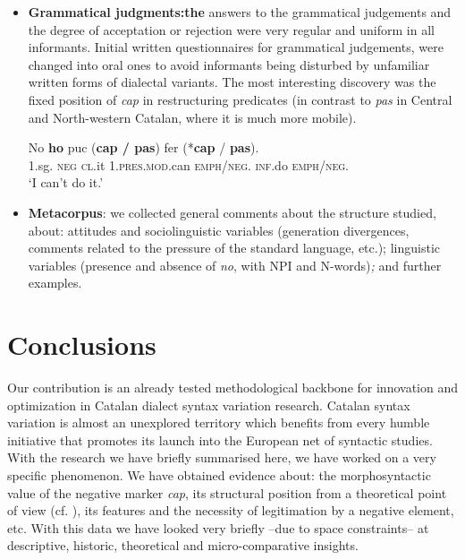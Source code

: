 \documentclass[output=paper]{LSP/langsci}
\begin{document}
\begin{itemize}
\item \textbf{Grammatical judgments:}\textbf{\textmd{the}} answers to the grammatical judgements and the degree of acceptation or rejection were very regular and uniform in all informants. Initial written questionnaires for grammatical judgements, were changed into oral ones to avoid informants being disturbed by unfamiliar written forms of dialectal variants. The most interesting discovery was the fixed position of \textit{cap }in restructuring predicates (in contrast to \textit{pas }in Central and North-western Catalan, where it is much more mobile).

\ea
\label{ex:}
 {No} \textbf{ho} {puc}   {(\texttt{\textsuperscript{\checkmark}}\textbf{cap / pas})}   {fer} {(*\textbf{cap} / \texttt{\textsuperscript{\checkmark}}\textbf{pas}).}\\
{1.sg.}  {\textsc{neg}}   {\textsc{cl}.it}  {1.\textsc{pres.mod}.can}  {\textsc{emph}/\textsc{neg}.}  {\textsc{inf}.do} {\textsc{emph}/\textsc{neg}.}\\
\glt `I can’t do it.'\\
\z

\item \textbf{Metacorpus}: we collected general comments about the structure studied, about: attitudes and sociolinguistic variables (generation divergences, comments related to the pressure of the standard language, etc.); linguistic variables (presence and absence of \textit{no}, with NPI and N-words)\textit{; }and further examples. 
\end{itemize}

\section{Conclusions}
Our contribution is an already tested methodological backbone for innovation and optimization in Catalan dialect syntax variation research. Catalan syntax variation is almost an unexplored territory which benefits from every humble initiative that promotes  its launch into the European net of syntactic studies. With the research we have briefly summarised here, we have worked on a very specific phenomenon. We have obtained evidence about: the morphosyntactic value of the negative marker \textit{cap}, its structural position from a theoretical point of view (cf. \citealt{llop_negacio_2013,llop_cap_2014}), its features and the necessity of legitimation by a negative element, etc. With this data we have looked very briefly –due to space constraints– at descriptive, historic, theoretical and micro-comparative insights. 
\end{document}
